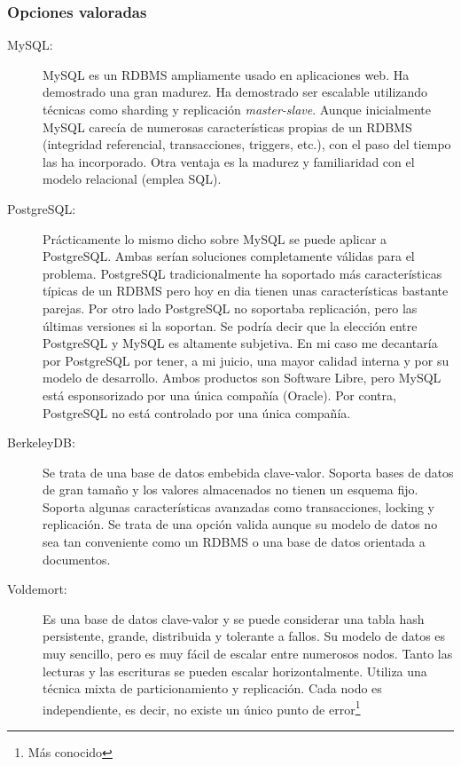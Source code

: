\subsubsection{Opciones valoradas}
\begin{description}

\item[MySQL:] MySQL es un RDBMS ampliamente usado en aplicaciones
  web. Ha demostrado una gran madurez. Ha demostrado ser escalable
  utilizando técnicas como sharding\cite{SHARDING} y replicación
  \emph{master-slave}\cite{MASTER-SLAVE}. Aunque inicialmente MySQL
  carecía de numerosas características propias de un RDBMS (integridad
  referencial, transacciones, triggers, etc.), con el paso del tiempo
  las ha incorporado. Otra ventaja es la madurez y familiaridad con el
  modelo relacional (emplea SQL).
\item[PostgreSQL:] Prácticamente lo mismo dicho sobre MySQL se puede
  aplicar a PostgreSQL. Ambas serían soluciones completamente válidas
  para el problema. PostgreSQL tradicionalmente ha soportado más
  características típicas de un RDBMS pero hoy en dia tienen unas
  características bastante parejas. Por otro lado PostgreSQL no
  soportaba replicación, pero las últimas versiones si la soportan. Se
  podría decir que la elección entre PostgreSQL y MySQL es altamente
  subjetiva. En mi caso me decantaría por PostgreSQL por tener, a mi
  juicio, una mayor calidad interna y por su modelo de
  desarrollo. Ambos productos son Software Libre, pero MySQL está
  esponsorizado por una única compañía (Oracle). Por contra,
  PostgreSQL no está controlado por una única compañía.
\item[BerkeleyDB:] Se trata de una base de datos embebida
  clave-valor. Soporta bases de datos de gran tamaño y los valores
  almacenados no tienen un esquema fijo. Soporta algunas
  características avanzadas como transacciones, locking y
  replicación. Se trata de una opción valida aunque su modelo de datos
  no sea tan conveniente como un RDBMS o una base de datos orientada a
  documentos.
\item[Voldemort:] Es una base de datos clave-valor y se puede
  considerar una tabla hash persistente, grande, distribuida y
  tolerante a fallos. Su modelo de datos es muy sencillo, pero es muy
  fácil de escalar entre numerosos nodos. Tanto las lecturas y las
  escrituras se pueden escalar horizontalmente. Utiliza una técnica
  mixta de particionamiento y replicación. Cada nodo es independiente,
  es decir, no existe un único punto de error\footnote{Más conocido
}
\end{description}
